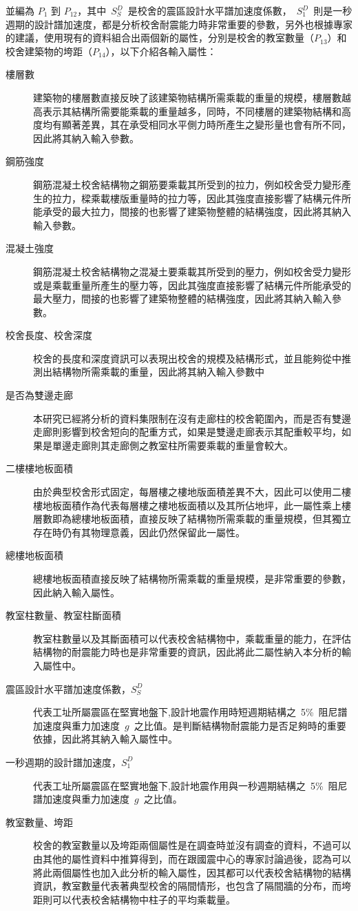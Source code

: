 並編為 $P_1$ 到 $P_{12}$，其中~$S^D_S$~是校舍的震區設計水平譜加速度係數，~$S^D_1$~則是一秒週期的設計譜加速度，都是分析校舍耐震能力時非常重要的參數，另外也根據專家的建議，使用現有的資料組合出兩個新的屬性，分別是校舍的教室數量（$P_{13}$）和校舍建築物的垮距（$P_{14}$），以下介紹各輸入屬性：

\begin{description}
  \item[樓層數]
  建築物的樓層數直接反映了該建築物結構所需乘載的重量的規模，樓層數越高表示其結構所需要能乘載的重量越多，同時，不同樓層的建築物結構和高度均有顯著差異，其在承受相同水平側力時所產生之變形量也會有所不同，因此將其納入輸入參數。
  \item[鋼筋強度]
  鋼筋混凝土校舍結構物之鋼筋要乘載其所受到的拉力，例如校舍受力變形產生的拉力，樑乘載樓版重量時的拉力等，因此其強度直接影響了結構元件所能承受的最大拉力，間接的也影響了建築物整體的結構強度，因此將其納入輸入參數。
  \item[混凝土強度]
  鋼筋混凝土校舍結構物之混凝土要乘載其所受到的壓力，例如校舍受力變形或是乘載重量所產生的壓力等，因此其強度直接影響了結構元件所能承受的最大壓力，間接的也影響了建築物整體的結構強度，因此將其納入輸入參數。
  \item[校舍長度、校舍深度]
  校舍的長度和深度資訊可以表現出校舍的規模及結構形式，並且能夠從中推測出結構物所需乘載的重量，因此將其納入輸入參數中
  \item[是否為雙邊走廊]
  本研究已經將分析的資料集限制在沒有走廊柱的校舍範圍內，而是否有雙邊走廊則影響到校舍短向的配重方式，如果是雙邊走廊表示其配重較平均，如果是單邊走廊則其走廊側之教室柱所需要乘載的重量會較大。
  \item[二樓樓地板面積]
  由於典型校舍形式固定，每層樓之樓地版面積差異不大，因此可以使用二樓樓地板面積作為代表每層樓之樓地板面積以及其所佔地坪，此一屬性乘上樓層數即為總樓地板面積，直接反映了結構物所需乘載的重量規模，但其獨立存在時仍有其物理意義，因此仍然保留此一屬性。
  \item[總樓地板面積]
  總樓地板面積直接反映了結構物所需乘載的重量規模，是非常重要的參數，因此納入輸入屬性。
  \item[教室柱數量、教室柱斷面積]
  教室柱數量以及其斷面積可以代表校舍結構物中，乘載重量的能力，在評估結構物的耐震能力時也是非常重要的資訊，因此將此二屬性納入本分析的輸入屬性中。
  \item[震區設計水平譜加速度係數，$S^D_S$]
  代表工址所屬震區在堅實地盤下,設計地震作用時短週期結構之~5\%~阻尼譜加速度與重力加速度~$g$~之比值。是判斷結構物耐震能力是否足夠時的重要依據，因此將其納入輸入屬性中。
  \item[一秒週期的設計譜加速度，$S^D_1$]
  代表工址所屬震區在堅實地盤下,設計地震作用與一秒週期結構之~5\%~阻尼譜加速度與重力加速度~$g$~之比值。
  \item[教室數量、垮距]
  校舍的教室數量以及垮距兩個屬性是在調查時並沒有調查的資料，不過可以由其他的屬性資料中推算得到，而在跟國震中心的專家討論過後，認為可以將此兩個屬性也加入此分析的輸入屬性，因其都可以代表校舍結構物的結構資訊，教室數量代表著典型校舍的隔間情形，也包含了隔間牆的分布，而垮距則可以代表校舍結構物中柱子的平均乘載量。
\end{description}

